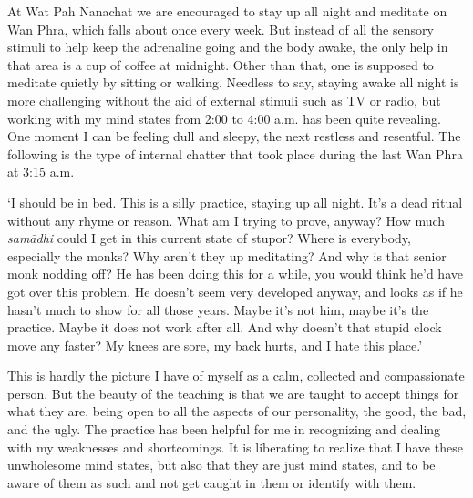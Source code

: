 At Wat Pah Nanachat we are encouraged to stay up all night and meditate
on Wan Phra, which falls about once every week. But instead of all the
sensory stimuli to help keep the adrenaline going and
the body awake, the only help in that area is a cup of coffee at
midnight. Other than that, one is supposed to meditate quietly by
sitting or walking. Needless to say, staying awake all night is more
challenging without the aid of external stimuli such as TV or radio, but
working with my mind states from 2:00 to 4:00 a.m. has been quite
revealing. One moment I can be feeling dull and sleepy, the next
restless and resentful. The following is the type of internal chatter
that took place during the last Wan Phra at 3:15 a.m.

`I should be in bed. This is a silly practice, staying up all night. 
It's a dead ritual without any rhyme or reason. What am I trying to
prove, anyway? How much \emph{samādhi} could I get in this current state
of stupor? Where is everybody, especially the monks? Why aren't they up
meditating? And why is that senior monk nodding off? He has been doing
this for a while, you would think he'd have got over this problem. He
doesn't seem very developed anyway, and looks as if he hasn't much to
show for all those years. Maybe it's not him, maybe it's the practice. 
Maybe it does not work after all. And why doesn't that stupid clock move
any faster? My knees are sore, my back hurts, and I hate this place.'

This is hardly the picture I have of myself as a calm, collected and
compassionate person. But the beauty of the teaching is that we are
taught to accept things for what they are, being open to all the aspects
of our personality, the good, the bad, and the ugly. The practice has
been helpful for me in recognizing and dealing with my weaknesses and
shortcomings. It is liberating to realize that I have these unwholesome
mind states, but also that they are just mind states, and to be aware of
them as such and not get caught in them or identify with them. 

